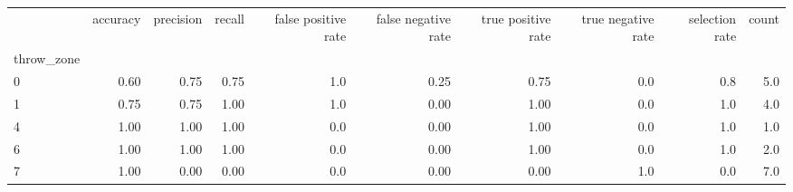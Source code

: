 \begin{tabular}{lrrrrrrrrr}
\toprule
{} &  accuracy &  precision &  recall &  false positive rate &  false negative rate &  true positive rate &  true negative rate &  selection rate &  count \\
throw\_zone &           &            &         &                      &                      &                     &                     &                 &        \\
\midrule
0          &      0.60 &       0.75 &    0.75 &                  1.0 &                 0.25 &                0.75 &                 0.0 &             0.8 &    5.0 \\
1          &      0.75 &       0.75 &    1.00 &                  1.0 &                 0.00 &                1.00 &                 0.0 &             1.0 &    4.0 \\
4          &      1.00 &       1.00 &    1.00 &                  0.0 &                 0.00 &                1.00 &                 0.0 &             1.0 &    1.0 \\
6          &      1.00 &       1.00 &    1.00 &                  0.0 &                 0.00 &                1.00 &                 0.0 &             1.0 &    2.0 \\
7          &      1.00 &       0.00 &    0.00 &                  0.0 &                 0.00 &                0.00 &                 1.0 &             0.0 &    7.0 \\
\bottomrule
\end{tabular}
